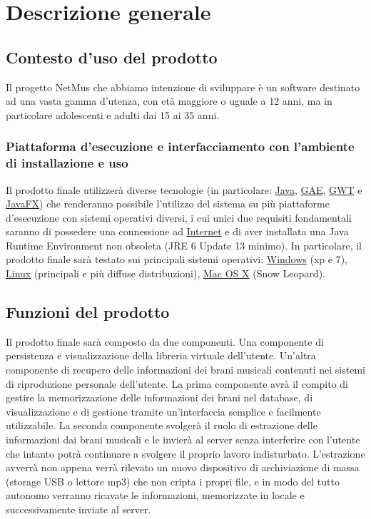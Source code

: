 

\chapter{Descrizione generale}
\thispagestyle{fancy}

\section{Contesto d'uso del prodotto}
Il progetto NetMus che abbiamo intenzione di sviluppare \`e un software
destinato ad una vasta gamma d'utenza, con et\`a maggiore o uguale
a 12 anni, ma in particolare adolescenti e adulti dai 15 ai 35 anni.

\subsection{Piattaforma d'esecuzione e interfacciamento con l'ambiente di
installazione e uso}
Il prodotto finale utilizzer\`a diverse tecnologie (in particolare:
\underline{Java}, \underline{GAE}, \underline{GWT} e \underline{JavaFX}) che
renderanno possibile l'utilizzo del sistema su pi\`u piattaforme d'esecuzione con sistemi operativi diversi, i cui unici due requisiti
fondamentali saranno di possedere una connessione ad \underline{Internet} e di aver
installata una Java Runtime Environment non obsoleta (JRE 6 Update 13 minimo).
In particolare, il prodotto finale sar\`a testato sui principali sistemi operativi: \underline{Windows} (xp e 7), \underline{Linux} (principali e
pi\`u diffuse distribuzioni), \underline{Mac OS X} (Snow Leopard).
\section{Funzioni del prodotto}
Il prodotto finale sar\`a composto da due componenti. Una componente di
persistenza e visualizzazione della libreria virtuale dell'utente. Un'altra
componente di recupero delle informazioni dei brani musicali contenuti nei
sistemi di riproduzione personale dell'utente. La prima componente avr\`a il
compito di gestire la memorizzazione delle informazioni dei brani nel database,
di visualizzazione e di gestione tramite un'interfaccia semplice e facilmente
utilizzabile. La seconda componente svolger\`a il ruolo di estrazione delle
informazioni dai brani musicali e le invier\`a al server senza interferire con
l'utente che intanto potr\`a continuare a svolgere il proprio lavoro
indisturbato. L'estrazione avverr\`a non appena verr\`a rilevato un nuovo
dispositivo di archiviazione di massa (storage USB o lettore mp3)
che non cripta i propri file, e in modo del tutto autonomo verranno ricavate le
informazioni, memorizzate in locale e successivamente inviate al server.

